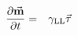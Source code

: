 \documentclass[12pt]{article}
\newcommand{\vc}[1]{\ensuremath{\vec{\textbf{#1}}}}
\newcommand{\m}{\vc{m}}
\newcommand{\tq}[1]{\vc{\ensuremath{\tau}}\ensuremath{_\mathrm{#1}}}
\begin{document}
\pagestyle{empty}

\begin{eqnarray*}
	\frac{\partial \m}{\partial t} &=& \gamma_\mathrm{LL} \tq{}
\end{eqnarray*}
\end{document}
